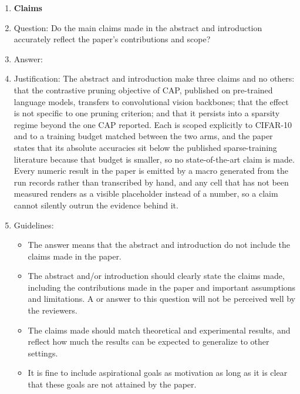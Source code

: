 \begin{enumerate}

\item {\bf Claims}
    \item[] Question: Do the main claims made in the abstract and introduction accurately reflect the paper's contributions and scope?
    \item[] Answer: \answerYes{}
    \item[] Justification: The abstract and introduction make three claims and no others: that the contrastive pruning objective of CAP, published on pre-trained language models, transfers to convolutional vision backbones; that the effect is not specific to one pruning criterion; and that it persists into a sparsity regime beyond the one CAP reported. Each is scoped explicitly to CIFAR-10 and to a training budget matched between the two arms, and the paper states that its absolute accuracies sit below the published sparse-training literature because that budget is smaller, so no state-of-the-art claim is made. Every numeric result in the paper is emitted by a macro generated from the run records rather than transcribed by hand, and any cell that has not been measured renders as a visible placeholder instead of a number, so a claim cannot silently outrun the evidence behind it.
    \item[] Guidelines:
    \begin{itemize}
        \item The answer \answerNA{} means that the abstract and introduction do not include the claims made in the paper.
        \item The abstract and/or introduction should clearly state the claims made, including the contributions made in the paper and important assumptions and limitations. A \answerNo{} or \answerNA{} answer to this question will not be perceived well by the reviewers.
        \item The claims made should match theoretical and experimental results, and reflect how much the results can be expected to generalize to other settings.
        \item It is fine to include aspirational goals as motivation as long as it is clear that these goals are not attained by the paper.
    \end{itemize}


\end{enumerate}
